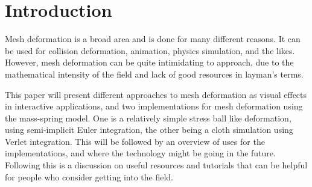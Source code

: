 \chapter{Introduction}
\label{chap:introduction}
Mesh deformation is a broad area and is done for many different reasons.
It can be used for collision deformation, animation, physics simulation, and the likes.
However, mesh deformation can be quite intimidating to approach, due to the mathematical intensity of the field and lack of good resources in layman's terms.

This paper will present different approaches to mesh deformation as visual effects in interactive applications, 
and two implementations for mesh deformation using the mass-spring model. 
One is a relatively simple stress ball like deformation, using semi-implicit Euler integration,
the other being a cloth simulation using Verlet integration.
This will be followed by an overview of uses for the implementations, and where the technology might be going in the future.
Following this is a discussion on useful resources and tutorials that can be helpful for people who consider getting into the field.